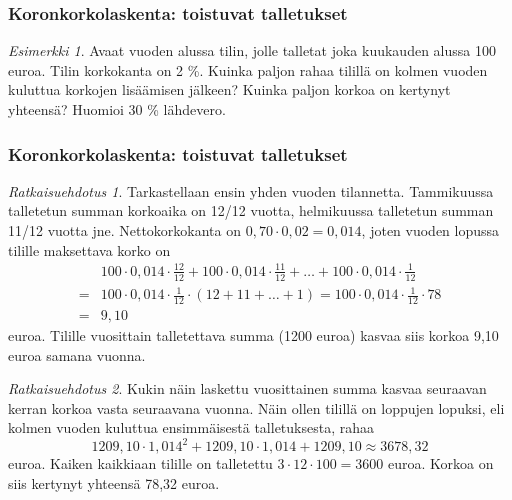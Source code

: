 \documentclass[]{beamer}\usepackage[]{graphicx}\usepackage[]{color}
\theoremstyle{remark}
\newtheorem{esim}{Esimerkki}
\newtheorem{ratkaisu}{Ratkaisuehdotus}
\begin{document}
\begin{frame}
    \frametitle{Koronkorkolaskenta: toistuvat talletukset}
    \pause
    \begin{esim}
        Avaat vuoden alussa tilin, jolle talletat joka kuukauden alussa 100 euroa.
        Tilin korkokanta on 2 \%. Kuinka paljon rahaa tilillä on kolmen vuoden kuluttua korkojen lisäämisen jälkeen?
        Kuinka paljon korkoa on kertynyt yhteensä? Huomioi 30 \% lähdevero.
    \end{esim}
\end{frame}

\begin{frame}
    \frametitle{Koronkorkolaskenta: toistuvat talletukset}
    \pause
    \begin{ratkaisu}
      \pause
        Tarkastellaan ensin yhden vuoden tilannetta. 
        \pause
        Tammikuussa talletetun summan korkoaika on 12/12 vuotta, helmikuussa
        talletetun summan 11/12 vuotta jne. 
        \pause Nettokorkokanta on \(0,70\cdot 0,02 = 0,014\),
        joten vuoden lopussa tilille maksettava korko on 
        \pause
        \begin{align*}
             &100\cdot0,014\cdot\frac{12}{12} + 100\cdot0,014\cdot\frac{11}{12} + \ldots + 100\cdot0,014\cdot\frac{1}{12}\\
            =&100\cdot0,014\cdot\frac{1}{12}\cdot(12+11+\ldots+1) = 100\cdot0,014\cdot\frac{1}{12}\cdot78\\
            =&9,10
        \end{align*}
        euroa. 
        \pause Tilille vuosittain talletettava summa (1200 euroa) kasvaa siis korkoa 9,10 euroa samana vuonna.
    \end{ratkaisu}
\end{frame}

\begin{frame}
    \begin{ratkaisu}
        Kukin näin laskettu vuosittainen summa kasvaa seuraavan kerran korkoa vasta seuraavana vuonna.
        \pause
        Näin ollen tilillä on loppujen lopuksi, eli kolmen vuoden kuluttua ensimmäisestä talletuksesta, rahaa \pause
        \[
            1209,10\cdot 1,014^2+1209,10\cdot1,014+1209,10\approx 3678,32
        \]
        euroa.
        \pause
        Kaiken kaikkiaan tilille on talletettu \(3\cdot12\cdot100 = 3600\) euroa.
        \pause
        Korkoa on siis kertynyt yhteensä 78,32 euroa.
    \end{ratkaisu}
\end{frame}
\end{document}
